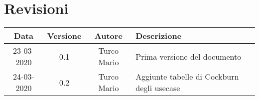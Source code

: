 %
%	 
%

\chapter*{Revisioni}
\begin{center}
    \begin{table}[h]
        \begin{tabularx}{\textwidth}[t]{|c|c|c|X|}
            \hline
            Data & Versione & Autore & Descrizione\\
            \hline
            23-03-2020 & 0.1 & Turco Mario & Prima versione del documento\\
            \hline
            24-03-2020 & 0.2 & Turco Mario & Aggiunte tabelle di Cockburn degli usecase\\
            \hline
        \end{tabularx}
    \end{table}
\end{center}